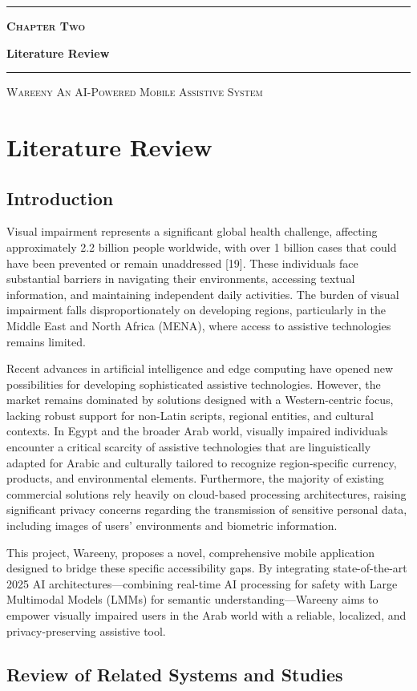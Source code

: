 \documentclass[a4paper]{report}
\newcommand{\chaptercover}[3]{%
  \clearpage
  \thispagestyle{empty}
  \begin{center}
  \vspace*{\fill}
    \makebox[0pt]{\raisebox{-0.30\height}{\textcolor{coverghost}{\fontsize{190}{190}\selectfont\bfseries #1}}}\par
    \vspace{1.9cm}
    {\color{coveraccent}\rule{0.16\textwidth}{3pt}}\par
    \vspace{0.5cm}
    {\Large\bfseries\scshape\color{coveraccent} #2\par}
    \vspace{0.6cm}
    {\fontsize{32}{37}\selectfont\bfseries\color{coverink} #3\par}
    \vspace{0.8cm}
    {\color{coverink!35}\rule{0.55\textwidth}{0.6pt}}\par
  \vspace*{\fill}
    {\footnotesize\scshape\color{coverink!55} Wareeny \quad\textbullet\quad An AI-Powered Mobile Assistive System\par}
    \vspace{0.8cm}
  \end{center}
  \clearpage
}
\begin{document}
\chaptercover{2}{Chapter Two}{Literature Review}
\chapter{Literature Review}

\section{Introduction}

Visual impairment represents a significant global health challenge, affecting approximately 2.2 billion people worldwide, with over 1 billion cases that could have been prevented or remain unaddressed [19]. These individuals face substantial barriers in navigating their environments, accessing textual information, and maintaining independent daily activities. The burden of visual impairment falls disproportionately on developing regions, particularly in the Middle East and North Africa (MENA), where access to assistive technologies remains limited.

Recent advances in artificial intelligence and edge computing have opened new possibilities for developing sophisticated assistive technologies. However, the market remains dominated by solutions designed with a Western-centric focus, lacking robust support for non-Latin scripts, regional entities, and cultural contexts. In Egypt and the broader Arab world, visually impaired individuals encounter a critical scarcity of assistive technologies that are linguistically adapted for Arabic and culturally tailored to recognize region-specific currency, products, and environmental elements. Furthermore, the majority of existing commercial solutions rely heavily on cloud-based processing architectures, raising significant privacy concerns regarding the transmission of sensitive personal data, including images of users' environments and biometric information.

This project, Wareeny, proposes a novel, comprehensive mobile application designed to bridge these specific accessibility gaps. By integrating state-of-the-art 2025 AI architectures---combining real-time AI processing for safety with Large Multimodal Models (LMMs) for semantic understanding---Wareeny aims to empower visually impaired users in the Arab world with a reliable, localized, and privacy-preserving assistive tool.

\section{Review of Related Systems and Studies}
\end{document}
